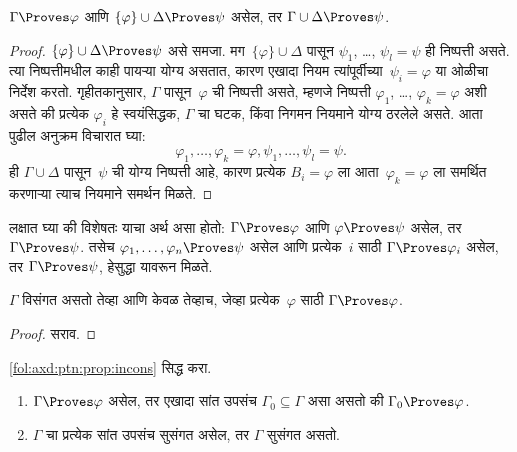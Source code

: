 \begin{prop}[संक्रमकता]
\label{fol:axd:ptn:prop:transitivity}
$\Gamma \Proves \varphi$ आणि $\{\varphi\} \cup \Delta \Proves
\psi$ असेल, तर $\Gamma \cup \Delta \Proves \psi$.
\end{prop}

\begin{proof}
  $\{\varphi\} \cup \Delta \Proves \psi$ असे समजा. मग~$\{\varphi\} \cup
  \Delta$ पासून $\psi_1$, \dots, $\psi_l = \psi$ ही निष्पत्ती असते.
  त्या निष्पत्तीमधील काही पायऱ्या योग्य असतात, कारण एखादा नियम
  त्यांपूर्वीच्या~$\psi_i = \varphi$ या ओळीचा निर्देश करतो. गृहीतकानुसार,
  $\Gamma$ पासून~$\varphi$ ची निष्पत्ती असते, म्हणजे निष्पत्ती
  $\varphi_1$, \dots, $\varphi_k = \varphi$ अशी असते की प्रत्येक $\varphi_i$ हे स्वयंसिद्धक,
  $\Gamma$ चा घटक, किंवा निगमन नियमाने योग्य ठरलेले असते. आता
  पुढील अनुक्रम विचारात घ्या:
  \[  \varphi_1, \dots, \varphi_k = \varphi, \psi_1, \dots, \psi_l = \psi.
  \]
  ही $\Gamma \cup \Delta$ पासून~$\psi$ ची योग्य निष्पत्ती आहे, कारण
  प्रत्येक $B_i = \varphi$ ला आता~$\varphi_k = \varphi$ ला समर्थित करणाऱ्या त्याच नियमाने
  समर्थन मिळते.
\end{proof}

लक्षात घ्या की विशेषतः याचा अर्थ असा होतो: $\Gamma \Proves \varphi$ आणि $\varphi
\Proves \psi$ असेल, तर $\Gamma \Proves \psi$. तसेच $\varphi_1,
\dots, \varphi_n \Proves \psi$ असेल आणि प्रत्येक~$i$ साठी $\Gamma \Proves \varphi_i$
असेल, तर $\Gamma \Proves \psi$, हेसुद्धा यावरून मिळते.

\begin{prop}
\label{fol:axd:ptn:prop:incons}
$\Gamma$ विसंगत असतो तेव्हा आणि केवळ तेव्हाच, जेव्हा प्रत्येक~$\varphi$ साठी
$\Gamma \Proves \varphi$.
\end{prop}

\begin{proof}
सराव.
\end{proof}


\begin{prob}
\ref{fol:axd:ptn:prop:incons} सिद्ध करा.
\end{prob}




\begin{prop}[संहतता]
\label{fol:axd:ptn:prop:proves-compact}
  \begin{enumerate}
  \item $\Gamma \Proves \varphi$ असेल, तर एखादा सांत उपसंच $\Gamma_0
    \subseteq \Gamma$ असा असतो की $\Gamma_0 \Proves \varphi$.
  \item $\Gamma$ चा प्रत्येक सांत उपसंच सुसंगत असेल, तर $\Gamma$ सुसंगत
    असतो.
  \end{enumerate}
\end{prop}

